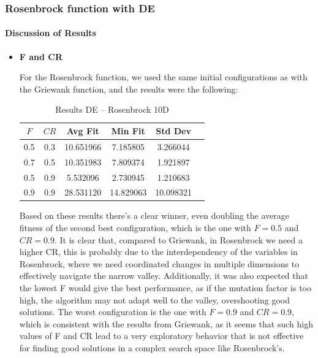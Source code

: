 \documentclass[12pt,a4paper]{article}
\begin{document}
\subsubsection{Rosenbrock function with DE}


\paragraph{Discussion of Results}
\begin{itemize} 
        \item \textbf{F and CR}
        
        For the Rosenbrock function, we used the same initial configurations as with the Griewank function, and the results were the following:
        \begin{table}[H]
        \centering
        \begin{tabular}{c c c c c c}
        \hline
        $F$ & $CR$ & Avg Fit & Min Fit & Std Dev \\
        \hline
        0.5 & 0.3 & 10.651966 & 7.185805 & 3.266044 \\
        0.7 & 0.5 & 10.351983 & 7.809374 & 1.921897 \\
        0.5 & 0.9 & 5.532096 & 2.730945 & 1.210683 \\
        0.9 & 0.9 & 28.531120 & 14.829063 & 10.098321 \\
        \hline
        \end{tabular}
        \caption{Results DE – Rosenbrock 10D}
        \end{table}

        Based on these results there's a clear winner, even doubling the average fitness of the second best configuration, which is the one with $F=0.5$ and $CR=0.9$.
        It is clear that, compared to Griewank, in Rosenbrock we need a higher CR, this is probably due to the interdependency of the variables in Rosenbrock, where we need coordinated changes in multiple dimensions to effectively navigate the narrow valley.
        Additionally, it was also expected that the lowest F would give the best performance, as if the mutation factor is too high, the algorithm may not adapt well to the valley, overshooting good solutions.
            The worst configuration is the one with $F=0.9$ and $CR=0.9$, which is consistent with the results from Griewank, as it seems that such high values of F and CR lead to a very exploratory behavior that is not effective for finding good solutions in a complex search space like Rosenbrock's.
            

\end{itemize}
\end{document}
